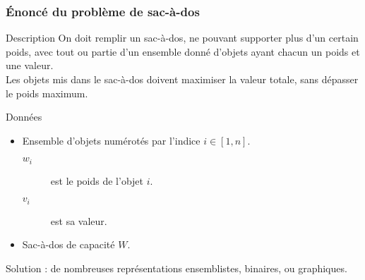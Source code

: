\documentclass{beamer}
\begin{document}
\begin{frame}
  \frametitle{Énoncé du problème de sac-à-dos}

  \begin{block}{Description}
    On doit remplir un sac-à-dos, ne pouvant supporter plus d'un certain poids, avec tout ou partie d'un ensemble donné d'objets ayant chacun un poids et une valeur.\\
    Les objets mis dans le sac-à-dos doivent maximiser la valeur totale, sans dépasser le poids maximum.
  \end{block}


  \begin{block}{Données}
    \begin{itemize}
    \item Ensemble d'objets numérotés par l'indice $i \in [1,n]$.
      \begin{description}
      \item[$w_i$] est le poids de l'objet $i$.
      \item[$v_i$] est sa valeur.
      \end{description}
    \item Sac-à-dos de capacité $W$.
    \end{itemize}
  \end{block}

  \begin{block}{Solution : de nombreuses représentations}
    ensemblistes, binaires, ou graphiques.
  \end{block}
\end{frame}
\end{document}
